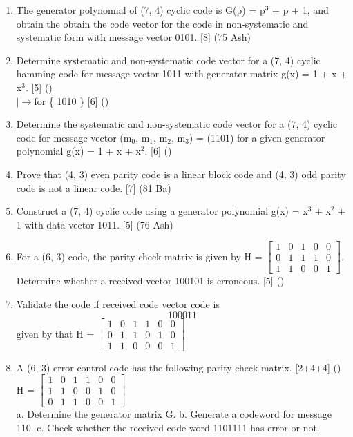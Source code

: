 \documentclass[12pt]{article}
\newcommand{\lb}{\\$\left|\rightarrow\right.$}
\begin{document}
\begin{enumerate}
      	\item The generator polynomial of (7, 4) cyclic code is G(p) = p$^3$ + p + 1, and obtain the obtain the code vector for the code in non-systematic and systematic form with message vector 0101. \hfill [8] (75 Ash)

        \item Determine systematic and non-systematic code vector for a (7, 4) cyclic hamming code for message vector { 1011 } with generator matrix g(x) = 1 + x + x$^3$. \hfill [5] ()
        \lb for \{ 1010 \} \hfill [6] ()
        
        \item Determine the systematic and non-systematic code vector for a (7, 4) cyclic code for message vector (m$_0$, m$_1$, m$_2$, m$_3$) = (1101) for a given generator polynomial g(x) = 1 + x + x$^2$. \hfill [6] ()

        \item Prove that (4, 3) even parity code is a linear block code and (4, 3) odd parity code is not a linear code. \hfill [7] (81 Ba)

        \item Construct a (7, 4) cyclic code using a generator polynomial g(x) = x$^3$ + x$^2$ + 1 with data vector 1011. \hfill [5] (76 Ash)
        
        \item For a (6, 3) code, the parity check matrix is given by H = 
        $\begin{bmatrix}
        	1 & 0 & 1 & 0 & 0 \\
        	0 & 1 & 1 & 1 & 0 \\
        	1 & 1 & 0 & 0 & 1
        \end{bmatrix}
        $. Determine whether a received vector 100101 is erroneous. \hfill [5] ()
        
        \item Validate the code if received code vector code is \[ 100011 \] given by that H =
        $\begin{bmatrix}
        	1 & 0 & 1 & 1 & 0 & 0 \\
        	0 & 1 & 1 & 0 & 1 & 0 \\
        	1 & 1 & 0 & 0 & 0 & 1
        \end{bmatrix}
        $
        
        \item A (6, 3) error control code has the following parity check matrix. \hfill [2+4+4] ()\\
        H = $\begin{bmatrix}
        	1 & 0 & 1 & 1 & 0 & 0 \\
        	1 & 1 & 0 & 0 & 1 & 0 \\
        	0 & 1 & 1 & 0 & 0 & 1
        \end{bmatrix}$\\
        a. Determine the generator matrix G.
        b. Generate a codeword for message 110.
        c. Check whether the received code word 1101111 has error or not.
        

\end{enumerate}
\end{document}
